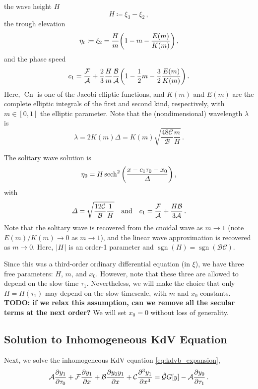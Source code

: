 \documentclass{jfm}
\let\Oldsubsection\subsection
\renewcommand{\subsection}{\FloatBarrier\Oldsubsection}
\DeclareMathOperator{\cn}{Cn}
\DeclareMathOperator{\sgn}{sgn}
\begin{document}
the wave height $H$
\begin{equation}
  H \coloneqq \xi_3 - \xi_2 \,,
\end{equation}
the trough elevation
\begin{equation}
  \eta_t \coloneqq \xi_2 = \frac{H}{m} \pqty{1 - m -\frac{E(m)}{K(m)}}
  \,,
\end{equation}
and the phase speed
\begin{equation}
  c_1 = \frac{\mathcal{F}}{\mathcal{A}} + \frac{2}{3} \frac{H}{m}
  \frac{\mathcal{B}}{\mathcal{A}} \pqty{1 - \frac{1}{2} m - \frac{3}{2}
     \frac{E(m)}{K(m)}} \,.
\end{equation}
Here, $\cn$ is one of the Jacobi elliptic functions, and $K(m)$ and
$E(m)$ are the complete elliptic integrals of the first and second kind,
respectively, with $m \in [0,1]$ the elliptic parameter.
Note that the (nondimensional) wavelength $\lambda$ is
\begin{equation}
  \lambda = 2 K(m) \Delta = K(m) \sqrt{\frac{48
  \mathcal{C}}{\mathcal{B}} \frac{m}{H}} \,.
  \label{eq:nondim_lambda}
\end{equation}

The solitary wave solution is
\begin{equation}
  \eta_0 = H \sech^2\pqty{\frac{x - c_1 \tau_0 - x_0}{\Delta}} \,,
\end{equation}
with
\begin{equation}
  \Delta = \sqrt{\frac{12 \mathcal{C}}{\mathcal{B}} \frac{1}{H}}
  \qq{and}
  c_1 = \frac{\mathcal{F}}{\mathcal{A}} + \frac{H \mathcal{B}}{3
    \mathcal{A}} \,.
\end{equation}
Note that the solitary wave is recovered from the cnoidal wave as $m \to
1$ (note $E(m)/K(m) \to 0$ as $m \to 1$), and the linear wave
approximation is recovered as $m \to 0$.
Here, $\abs{H}$ is an order-1 parameter and $\sgn(H) = \sgn(\mathcal{B}
\mathcal{C})$.

Since this was a third-order ordinary differential equation (in $\xi$),
we have three free parameters: $H$, $m$, and $x_0$.
However, note that these three are allowed to depend on the slow time
$\tau_1$.
Nevertheless, we will make the choice that only $H = H(\tau_1)$ may
depend on the slow timescale, with $m$ and $x_0$ constants.
\textbf{TODO: if we relax this assumption, can we remove all the secular
terms at the next order?}
We will set $x_0 = 0$ without loss of generality.

\subsection{\label{eq:kdv_inhom_solution} Solution to Inhomogeneous KdV
Equation}
Next, we solve the inhomogeneous KdV equation \cref{eq:kdvb_expansion},
\begin{equation}
  \mathcal{A} \pdv{y_1}{\tau_0} + \mathcal{F} \pdv{y_1}{x} + \mathcal{B}
  \pdv{y_0 y_1}{x} + \mathcal{C} \pdv[3]{y_1}{x} = \mathcal{\tilde{G}}
  G[y] - \mathcal{A} \pdv{y_0}{\tau_1} \,.
\end{equation}
\end{document}
